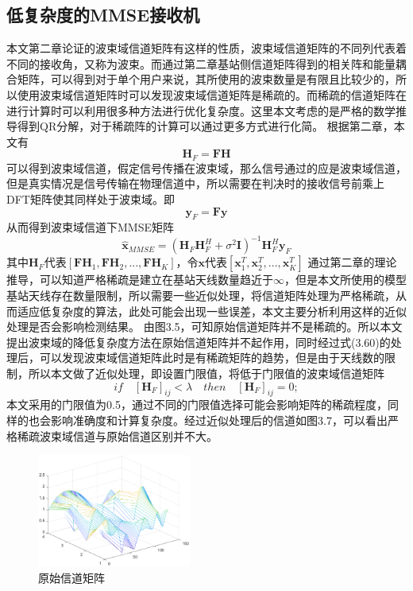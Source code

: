 \documentclass[bachelor,nocolorlinks, printoneside]{seuthesis} %
\begin{document}
\begin{Main}
\section{低复杂度的MMSE接收机}
本文第二章论证的波束域信道矩阵有这样的性质，波束域信道矩阵的不同列代表着不同的接收角，又称为波束。而通过第二章基站侧信道矩阵得到的相关阵和能量耦合矩阵，可以得到对于单个用户来说，其所使用的波束数量是有限且比较少的，所以使用波束域信道矩阵时可以发现波束域信道矩阵是稀疏的。而稀疏的信道矩阵在进行计算时可以利用很多种方法进行优化复杂度。这里本文考虑的是严格的数学推导得到QR分解，对于稀疏阵的计算可以通过更多方式进行化简。
根据第二章，本文有
\begin{equation}\label{key}
\mathbf{H}_{F} = \mathbf{F} \mathbf{H}
\end{equation}
可以得到波束域信道，假定信号传播在波束域，那么信号通过的应是波束域信道，但是真实情况是信号传输在物理信道中，所以需要在判决时的接收信号前乘上DFT矩阵使其同样处于波束域。即
\begin{equation}\label{key}
\mathbf{y}_F =\mathbf{F} \mathbf{y}
\end{equation}
从而得到波束域信道下MMSE矩阵
\begin{equation}\label{key}
\hat{\mathbf{x}}_{MMSE} = (\mathbf{H}_F\mathbf{H}_F^H + \sigma^2 \mathbf{I})^{-1}\mathbf{H}_F^H \mathbf{y}_F
\end{equation}
其中$\mathbf{H}_F$代表$[\mathbf{F}\mathbf{H}_1,\mathbf{F}\mathbf{H}_2,...,\mathbf{F}\mathbf{H}_K]$，令$\mathbf{x}$代表$[\mathbf{x}_1^T,\mathbf{x}_2^T,...,\mathbf{x}_K^T]$
通过第二章的理论推导，可以知道严格稀疏是建立在基站天线数量趋近于$\infty$，但是本文所使用的模型基站天线存在数量限制，所以需要一些近似处理，将信道矩阵处理为严格稀疏，从而适应低复杂度的算法，此处可能会出现一些误差，本文主要分析利用这样的近似处理是否会影响检测结果。
由图3.5，可知原始信道矩阵并不是稀疏的。所以本文提出波束域的降低复杂度方法在原始信道矩阵并不起作用，同时经过式(3.60)的处理后，可以发现波束域信道矩阵此时是有稀疏矩阵的趋势，但是由于天线数的限制，所以本文做了近似处理，即设置门限值，将低于门限值的波束域信道矩阵
\begin{equation}\label{key}
if\quad [\mathbf{H}_F]_{ij} <\lambda \quad then \quad [\mathbf{H}_F]_{ij}=0;
\end{equation}
本文采用的门限值为0.5，通过不同的门限值选择可能会影响矩阵的稀疏程度，同样的也会影响准确度和计算复杂度。经过近似处理后的信道如图3.7，可以看出严格稀疏波束域信道与原始信道区别并不大。
\begin{figure}[htbp!]
	\centering \includegraphics[width=0.45\textwidth]{img/3_1.eps} \caption{原始信道矩阵}

\end{figure}
\end{Main}
\end{document}
